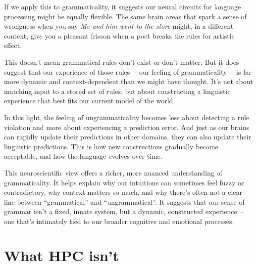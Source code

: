 If we apply this to grammaticality, it suggests our neural circuits for language processing might be equally flexible. The same brain areas that spark a sense of wrongness when you say \textit{Me and him went to the store} might, in a different context, give you a pleasant frisson when a poet breaks the rules for artistic effect.

This doesn't mean grammatical rules don't exist or don't matter. But it does suggest that our experience of those rules~-- our feeling of grammaticality~-- is far more dynamic and context-dependent than we might have thought. It's not about matching input to a stored set of rules, but about constructing a linguistic experience that best fits our current model of the world.

In this light, the feeling of ungrammaticality becomes less about detecting a rule violation and more about experiencing a prediction error. And just as our brains can rapidly update their predictions in other domains, they can also update their linguistic predictions. This is how new constructions gradually become acceptable, and how the language evolves over time.

This neuroscientific view offers a richer, more nuanced understanding of grammaticality. It helps explain why our intuitions can sometimes feel fuzzy or contradictory, why context matters so much, and why there's often not a clear line between ``grammatical'' and ``ungrammatical''. It suggests that our sense of grammar isn't a fixed, innate system, but a dynamic, constructed experience~-- one that's intimately tied to our broader cognitive and emotional processes.

%
%
%

\section{What HPC isn't}

%
%

